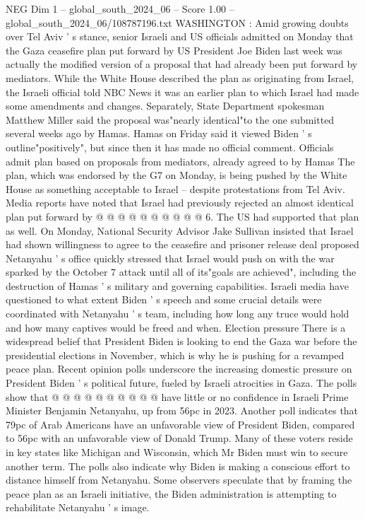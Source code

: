 \begin{textsample}{NEG Dim 1 – global\_south\_2024\_06 – Score 1.00 – global\_south\_2024\_06/108787196.txt}  \label{ex:f1_neg_400}
WASHINGTON : Amid growing doubts over Tel Aviv ' s stance, senior Israeli and US officials admitted on Monday that the Gaza ceasefire plan put forward by US President Joe Biden last week was actually the modified version of a proposal that had already been put forward by mediators.
While the White House described the plan as originating from Israel, the Israeli official told NBC News it was an earlier plan to which Israel had made some amendments and changes.
Separately, State Department spokesman Matthew Miller said the proposal was"nearly identical"to the one submitted several weeks ago by Hamas.
Hamas on Friday said it viewed Biden ' s outline"positively", but since then it has made no official comment.
Officials admit plan based on proposals from mediators, already agreed to by Hamas The plan, which was endorsed by the G7 on Monday, is being pushed by the White House as something acceptable to Israel -- despite protestations from Tel Aviv.
Media reports have noted that Israel had previously rejected an almost identical plan put forward by @ @ @ @ @ @ @ @ @ @ 6.
The US had supported that plan as well.
On Monday, National Security Advisor Jake Sullivan insisted that Israel had shown willingness to agree to the ceasefire and prisoner release deal proposed Netanyahu ' s office quickly stressed that Israel would push on with the war sparked by the October 7 attack until all of its"goals are achieved", including the destruction of Hamas ' s military and governing capabilities.
Israeli media have questioned to what extent Biden ' s speech and some crucial details were coordinated with Netanyahu ' s team, including how long any truce would hold and how many captives would be freed and when.
Election pressure There is a widespread belief that President Biden is looking to end the Gaza war before the presidential elections in November, which is why he is pushing for a revamped peace plan.
Recent opinion polls underscore the increasing domestic pressure on President Biden ' s political future, fueled by Israeli atrocities in Gaza.
The polls show that @ @ @ @ @ @ @ @ @ @ have little or no confidence in Israeli Prime Minister Benjamin Netanyahu, up from 56pc in 2023.
Another poll indicates that 79pc of Arab Americans have an unfavorable view of President Biden, compared to 56pc with an unfavorable view of Donald Trump.
Many of these voters reside in key states like Michigan and Wisconsin, which Mr Biden must win to secure another term.
The polls also indicate why Biden is making a conscious effort to distance himself from Netanyahu.
Some observers speculate that by framing the peace plan as an Israeli initiative, the Biden administration is attempting to rehabilitate Netanyahu ' s image.

\end{textsample}
